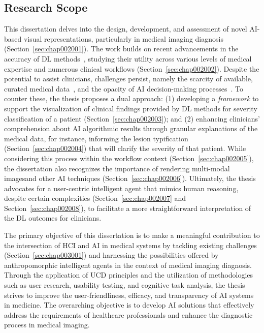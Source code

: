 \subsection{Research Scope}
\label{sec:chap001002001}

This dissertation delves into the design, development, and assessment of novel \ac{AI}-based visual representations, particularly in medical imaging diagnosis (Section~\ref{sec:chap002001}).
The work builds on recent advancements in the accuracy of \ac{DL} methods~\cite{9098470}, studying their utility across various levels of medical expertise and numerous clinical workflows (Section~\ref{sec:chap002002}).
Despite the potential to assist clinicians, challenges persist, namely the scarcity of available, curated medical data~\cite{10.1145/3313831.3376290}, and the opacity of \ac{AI} decision-making processes~\cite{Yue_2020_CVPR}.
To counter these, the thesis proposes a dual approach:
(1) developing a {\it framework} to support the visualization of clinical findings provided by \ac{DL} methods for severity classification of a patient (Section~\ref{sec:chap002003}); and
(2) enhancing clinicians' comprehension about \ac{AI} algorithmic results through granular explanations of the medical data, for instance, informing the lesion typification (Section~\ref{sec:chap002004}) that will clarify the severity of that patient.
While considering this process within the workflow context (Section~\ref{sec:chap002005}), the dissertation also recognizes the importance of rendering multi-modal images\footnotemark[3] and other \ac{AI} techniques (Section~\ref{sec:chap002006}).
Ultimately, the thesis advocates for a user-centric intelligent agent that mimics human reasoning, despite certain complexities (Section~\ref{sec:chap002007} and Section~\ref{sec:chap002008}), to facilitate a more straightforward interpretation of the \ac{DL} outcomes for clinicians.

The primary objective of this dissertation is to make a meaningful contribution to the intersection of \ac{HCI} and \ac{AI} in medical systems by tackling existing challenges (Section~\ref{sec:chap003001}) and harnessing the possibilities offered by anthropomorphic intelligent agents in the context of medical imaging diagnosis.
Through the application of \ac{UCD} principles and the utilization of methodologies such as user research, usability testing, and cognitive task analysis, the thesis strives to improve the user-friendliness, efficacy, and transparency of \ac{AI} systems in medicine.
The overarching objective is to develop \ac{AI} solutions that effectively address the requirements of healthcare professionals and enhance the diagnostic process in medical imaging.

